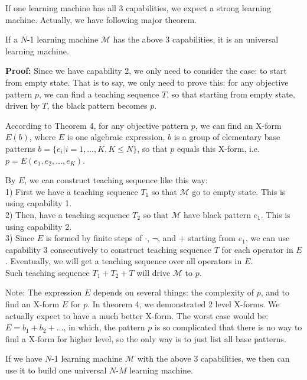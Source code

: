 If one learning machine has all 3 capabilities, we expect a strong learning machine. Actually, we have following major theorem.


\begin{theorem}
If a $N$-1 learning machine $\mathcal{M}$ has the above 3 capabilities, it is an universal learning machine. 
\end{theorem}
{\bf Proof: } Since we have capability 2, we only need to consider the case: to start from empty state. That is to say, we only need to prove this: for any objective pattern $p$, we can find a teaching sequence $T$, so that starting from empty state, driven by $T$, the black pattern becomes $p$. 

According to Theorem 4, for any objective pattern $p$, we can find an X-form $E(b)$, where $E$ is one algebraic expression, $b$ is a group of elementary base patterns $b = \{e_i | i = 1, \ldots, K, K \le N\}$, so that $p$ equals this X-form, i.e. $p = E(e_1, e_2, \ldots, e_K)$. 

By $E$, we can construct teaching sequence like this way: \\
1) First we have a teaching sequence $T_1$ so that $\mathcal{M}$ go to empty state. This is using capability 1.\\
2) Then, have a teaching sequence $T_2$ so that $\mathcal{M}$ have black pattern $e_1$. This is using capability 2. \\
3) Since $E$ is formed by finite steps of $\cdot$, $\neg$, and $+$ starting from $e_1$, we can use capability 3 consecutively to construct teaching sequence $T$ for each operator in $E$. Eventually, we will get a teaching sequence over all operators in $E$.\\
Such teaching sequence $T_1 + T_2 + T$ will drive $\mathcal{M}$ to $p$.   

Note: The expression $E$ depends on several things: the complexity of $p$, and to find an X-form $E$ for $p$. In theorem 4, we demonstrated 2 level X-forms. We actually expect to have a much better X-form. The worst case would be: $E = b_1 + b_2 + \ldots$, in which, the pattern $p$ is so complicated that there is no way to find a X-form for higher level, so the only way is to just list all base patterns.  



\begin{corollary}
If we have $N$-1 learning machine $\mathcal{M}$ with the above 3 capabilities, we then can use it to build one universal $N$-$M$ learning machine.
\end{corollary}

